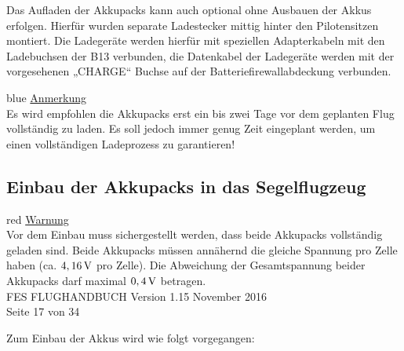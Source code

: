 Das Aufladen der Akkupacks kann auch optional ohne Ausbauen der Akkus erfolgen. Hierfür wurden separate Ladestecker mittig hinter den Pilotensitzen montiert. 
Die Ladegeräte werden hierfür mit speziellen Adapterkabeln mit den Ladebuchsen der B13 verbunden, die Datenkabel der Ladegeräte werden mit der vorgesehenen „CHARGE“ Buchse auf der Batteriefirewallabdeckung verbunden.\\

\begin{color}{blue}
\large{\underline{Anmerkung}}\\
Es wird empfohlen die Akkupacks erst ein bis zwei Tage vor
dem geplanten Flug vollständig zu laden. Es soll jedoch immer genug Zeit
eingeplant werden, um einen vollständigen Ladeprozess zu garantieren!
\end{color}

\subsection{Einbau der Akkupacks in das Segelflugzeug}

\begin{color}{red}
\large{\underline{Warnung}}\\
Vor dem Einbau muss sichergestellt werden, dass beide
Akkupacks vollständig geladen sind. Beide Akkupacks müssen annähernd die
gleiche Spannung pro Zelle haben (ca. $\unit[4,16]{V}$ pro Zelle). Die Abweichung der
Gesamtspannung beider Akkupacks darf maximal $\unit[0,4]{V}$ betragen.\\
FES FLUGHANDBUCH Version 1.15 November 2016\\
Seite 17 von 34
\end{color}

Zum Einbau der Akkus wird wie folgt vorgegangen:

